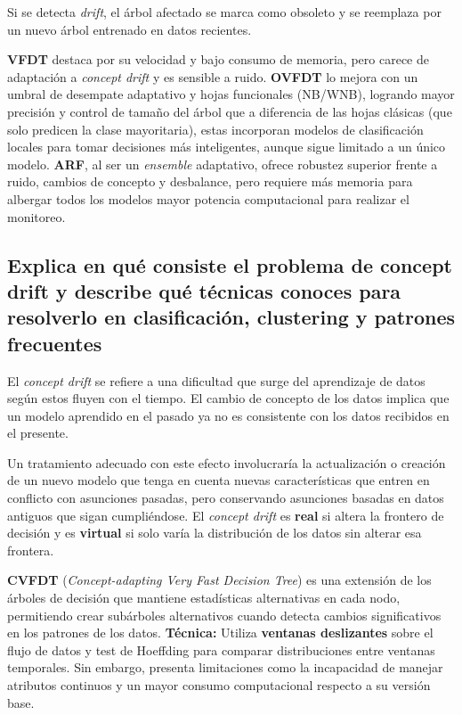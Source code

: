 \documentclass[12pt,letterpaper]{article}
\begin{document}
Si se detecta \textit{drift}, el árbol afectado se marca como obsoleto y se reemplaza por un nuevo árbol entrenado en datos recientes.

\textbf{VFDT} destaca por su velocidad y bajo consumo de memoria, pero carece de adaptación a \textit{concept drift} y es sensible a ruido. \textbf{OVFDT} lo mejora con un umbral de desempate adaptativo y hojas funcionales (NB/WNB), logrando mayor precisión y control de tamaño del árbol que a diferencia de las hojas clásicas (que solo predicen la clase mayoritaria), estas incorporan modelos de clasificación locales para tomar decisiones más inteligentes, aunque sigue limitado a un único modelo. \textbf{ARF}, al ser un \textit{ensemble} adaptativo, ofrece robustez superior frente a ruido, cambios de concepto y desbalance, pero requiere más memoria para albergar todos los modelos mayor potencia computacional para realizar el monitoreo.
\newpage

\subsection{Explica en qué consiste el problema de concept drift y describe qué técnicas conoces
    para resolverlo en clasificación, clustering y patrones frecuentes}

El \textit{concept drift} se refiere a una dificultad que surge del aprendizaje de datos según estos fluyen con el tiempo. El cambio de concepto de los datos implica que un modelo aprendido en el pasado ya no es consistente con los datos recibidos en el presente.

Un tratamiento adecuado con este efecto involucraría la actualización o creación de un nuevo modelo que tenga en cuenta nuevas características que entren en conflicto con asunciones pasadas, pero conservando asunciones basadas en datos antiguos que sigan cumpliéndose. El \textit{concept drift} es \textbf{real} si altera la frontero de decisión y es \textbf{virtual} si solo varía la distribución de los datos sin alterar esa frontera.

\textbf{CVFDT} (\textit{Concept-adapting Very Fast Decision Tree}) \cite{hulten2001cvfdt} es una extensión de los árboles de decisión que mantiene estadísticas alternativas en cada nodo, permitiendo crear subárboles alternativos cuando detecta cambios significativos en los patrones de los datos. \textbf{Técnica:} Utiliza \textbf{ventanas deslizantes} sobre el flujo de datos y test de Hoeffding para comparar distribuciones entre ventanas temporales. Sin embargo, presenta limitaciones como la incapacidad de manejar atributos continuos y un mayor consumo computacional respecto a su versión base.
\end{document}
